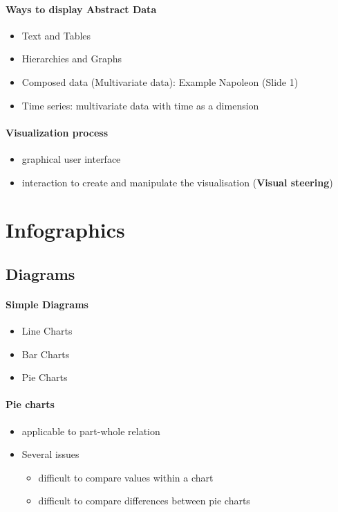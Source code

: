 \documentclass[10pt,a4paper]{article}
\begin{document}
	\paragraph{Ways to display Abstract Data}
	\begin{itemize}
		\item Text and Tables
		\item Hierarchies and Graphs
		\item Composed data (Multivariate data): Example Napoleon (Slide 1)
		\item Time series: multivariate data with time as a dimension
	\end{itemize}
	\paragraph*{Visualization process} 
	\begin{itemize}
		\item graphical user interface
		\item interaction to create and manipulate the visualisation (\textbf{Visual steering})
	\end{itemize}
	
\section{Infographics}
	
	\subsection{Diagrams}
	\paragraph{Simple Diagrams}
	\begin{itemize}
		\item Line Charts
		\item Bar Charts
		\item Pie Charts
	\end{itemize}
	
	\paragraph{Pie charts}
	\begin{itemize}
		\item applicable to part-whole relation
		\item Several issues 
		\begin{itemize}
			\item difficult to compare values within a chart
			\item difficult to compare differences between pie charts
		\end{itemize}
	\end{itemize}
	
\end{document}
